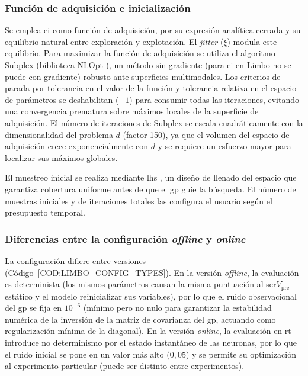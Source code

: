 \subsubsection{Función de adquisición e inicialización\label{SUBSUBSEC:ADQUISICION_INICIALIZACION}}

Se emplea \ac{ei} \cite{Mockus1978} como función de adquisición, por su expresión analítica cerrada y su equilibrio natural entre exploración y explotación. El \textit{jitter} ($\xi$) modula este equilibrio. Para maximizar la función de adquisición se utiliza el algoritmo Subplex \cite{Rowan1990} (biblioteca NLOpt \cite{Johnson2007}), un método sin gradiente (para \ac{ei} en Limbo no se puede con gradiente) robusto ante superficies multimodales. Los criterios de parada por tolerancia en el valor de la función y tolerancia relativa en el espacio de parámetros se deshabilitan ($-1$) para consumir todas las iteraciones, evitando una convergencia prematura sobre máximos locales de la superficie de adquisición. El número de iteraciones de Subplex se escala cuadráticamente con la dimensionalidad del problema $d$ (factor 150), ya que el volumen del espacio de adquisición crece exponencialmente con $d$ y se requiere un esfuerzo mayor para localizar sus máximos globales.

El muestreo inicial se realiza mediante \ac{lhs} \cite{McKay1979}, un diseño de llenado del espacio que garantiza cobertura uniforme antes de que el \ac{gp} guíe la búsqueda. El número de muestras iniciales y de iteraciones totales las configura el usuario según el presupuesto temporal.

\subsubsection{Diferencias entre la configuración \textit{offline} y \textit{online}\label{SUBSUBSEC:DIFERENCIAS_OFFLINE_ONLINE}}

La configuración difiere entre versiones (Código~\ref{COD:LIMBO_CONFIG_TYPES}). En la versión \textit{offline}, la evaluación es determinista (los mismos parámetros causan la misma puntuación al ser\(V_{\mathrm{pre}}\) estático y el modelo reinicializar sus variables), por lo que el ruido observacional del \ac{gp} se fija en $10^{-6}$ (mínimo pero no nulo para garantizar la estabilidad numérica de la inversión de la matriz de covarianza del \ac{gp}, actuando como regularización mínima de la diagonal). En la versión \textit{online}, la evaluación en \ac{rt} introduce no determinismo por el estado instantáneo de las neuronas, por lo que el ruido inicial se pone en un valor más alto ($0{,}05$) y se permite su optimización al experimento particular (puede ser distinto entre experimentos).

